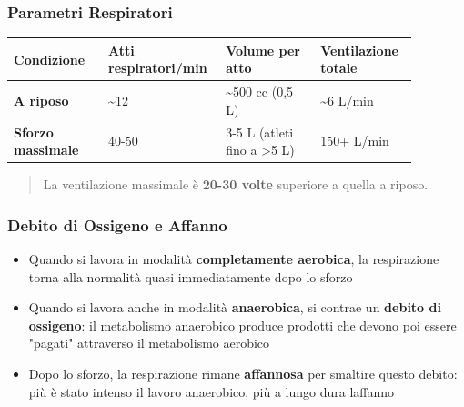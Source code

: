 \documentclass[a4paper,11pt]{article}
\providecommand{\tightlist}{%
  \setlength{\itemsep}{0pt}\setlength{\parskip}{0pt}}
\begin{document}
\subsubsection{Parametri Respiratori}\label{parametri-respiratori}

\begin{longtable}[]{@{}p{0.22\linewidth}p{0.22\linewidth}p{0.22\linewidth}p{0.22\linewidth}@{}}
      \toprule\noalign{}
      Condizione                & Atti respiratori/min & Volume per atto                    & Ventilazione
      totale                                                                                               \\
      \midrule\noalign{}
      \endhead
      \bottomrule\noalign{}
      \endlastfoot
      \textbf{A riposo}         & \textasciitilde12    & \textasciitilde500 cc (0,5 L)      &
      \textasciitilde6 L/min                                                                               \\
      \textbf{Sforzo massimale} & 40-50                & 3-5 L (atleti fino a \textgreater5
      L)                        & 150+ L/min                                                               \\
\end{longtable}

\begin{quote}
      La ventilazione massimale è \textbf{20-30 volte} superiore a quella a
      riposo.
\end{quote}

\subsubsection{Debito di Ossigeno e
      Affanno}\label{debito-di-ossigeno-e-affanno}

\begin{itemize}
      \tightlist
      \item
            Quando si lavora in modalità \textbf{completamente aerobica}, la
            respirazione torna alla normalità quasi immediatamente dopo lo sforzo
      \item
            Quando si lavora anche in modalità \textbf{anaerobica}, si contrae un
            \textbf{debito di ossigeno}: il metabolismo anaerobico produce
            prodotti che devono poi essere "pagati" attraverso il metabolismo
            aerobico
      \item
            Dopo lo sforzo, la respirazione rimane \textbf{affannosa} per smaltire
            questo debito: più è stato intenso il lavoro anaerobico, più a lungo
            dura l\textquotesingle affanno
\end{itemize}
\end{document}
